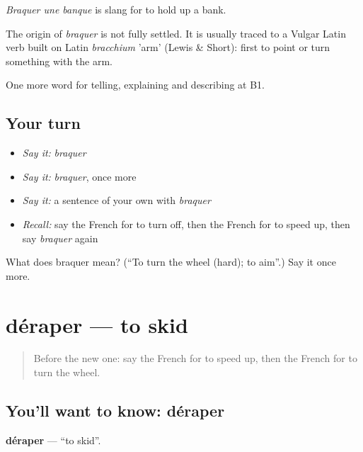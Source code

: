 \emph{Braquer une banque} is slang for to hold up a bank.

\begin{cousinweb}
The origin of \emph{braquer} is not fully settled. It is usually traced to a Vulgar Latin verb built on Latin \emph{bracchium} 'arm' (Lewis \& Short): first to point or turn something with the arm.
\end{cousinweb}

\begin{grammarlens}[title={What you've built}]
One more word for telling, explaining and describing at B1.
\end{grammarlens}

\subsection*{Your turn}
\begin{itemize}
\raggedright
  \item \emph{Say it:} \emph{braquer}
  \item \emph{Say it:} \emph{braquer}, once more
  \item \emph{Say it:} a sentence of your own with \emph{braquer}
  \item \emph{Recall:} say the French for to turn off, then the French for to speed up, then say \emph{braquer} again
\end{itemize}

\begin{tcolorbox}[breakable,colback=teal!4,colframe=teal!35!black,title={Before you move on}]
What does braquer mean? (\textquotedblleft{}To turn the wheel (hard); to aim\textquotedblright{}.) Say it once more.
\end{tcolorbox}
\section[déraper]{déraper — to skid}

\label{lesson:FR-C401-deraper}



\begin{quote}
Before the new one: say the French for to speed up, then the French for to turn the wheel.
\end{quote}

\subsection*{You'll want to know: déraper}
\textbf{déraper} — \textquotedblleft{}to skid\textquotedblright{}.

